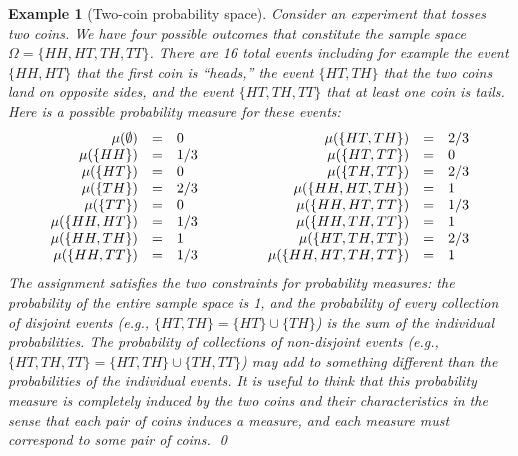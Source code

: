 \documentclass{article}
\theoremstyle{indented}
\newtheorem{example}{Example}
\newcommand{\pmeas}{\ensuremath{\mu}}
\begin{document}
\begin{example}[Two-coin probability space]
  Consider an experiment that tosses two coins. We have four possible
  outcomes that constitute the sample space
  $\Omega = \{ HH, HT, TH, TT \}$. There are 16 total events including
  for example the event $\{ HH, HT \}$ that the first coin is
  ``heads,'' the event $\{ HT, TH \}$ that the two coins land on
  opposite sides, and the event $\{ HT, TH, TT\}$ that at least one
  coin is tails. Here is a possible probability measure for these
  events:
\[\begin{array}{c@{\qquad\qquad}c}
\begin{array}{rcl}
\pmeas(\emptyset) &=& 0 \\
\pmeas(\{ HH \}) &=& 1/3 \\
\pmeas(\{ HT \}) &=& 0 \\
\pmeas(\{ TH \}) &=& 2/3 \\
\pmeas(\{ TT \}) &=& 0 \\
\pmeas(\{  HH, HT \}) &=& 1/3 \\
\pmeas(\{  HH, TH \}) &=& 1 \\
\pmeas(\{  HH , TT \}) &=& 1/3 
\end{array} & \begin{array}{rcl}
\pmeas(\{  HT, TH \}) &=& 2/3 \\
\pmeas(\{  HT , TT \}) &=& 0 \\
\pmeas(\{  TH , TT \}) &=& 2/3 \\
\pmeas(\{  HH, HT, TH \}) &=& 1 \\
\pmeas(\{  HH, HT, TT \}) &=& 1/3 \\
\pmeas(\{  HH, TH, TT \}) &=& 1 \\
\pmeas(\{  HT, TH, TT \}) &=& 2/3 \\
\pmeas(\{  HH, HT, TH, TT \}) &=& 1
\end{array}
\end{array}\]
The assignment satisfies the two constraints for probability measures:
the probability of the entire sample space is 1, and the probability
of every collection of disjoint events (e.g.,
$\{ HT, TH \} = \{ HT \} \cup \{ TH \}$) is the sum of the individual
probabilities. The probability of collections of non-disjoint events
(e.g., $\{ HT, TH, TT \} = \{ HT, TH \} \cup \{ TH , TT \}$) may add
to something different than the probabilities of the individual
events. It is useful to think that this probability measure is
completely induced by the two coins and their characteristics in the
sense that each pair of coins induces a measure, and each measure must
correspond to some pair of coins.
\qed\end{example}
\end{document}

